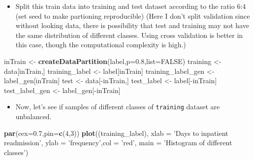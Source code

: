 \documentclass[]{article}
\newenvironment{Shaded}{\begin{snugshade}}{\end{snugshade}}
\newcommand{\KeywordTok}[1]{\textcolor[rgb]{0.13,0.29,0.53}{\textbf{{#1}}}}
\newcommand{\DataTypeTok}[1]{\textcolor[rgb]{0.13,0.29,0.53}{{#1}}}
\newcommand{\DecValTok}[1]{\textcolor[rgb]{0.00,0.00,0.81}{{#1}}}
\newcommand{\FloatTok}[1]{\textcolor[rgb]{0.00,0.00,0.81}{{#1}}}
\newcommand{\StringTok}[1]{\textcolor[rgb]{0.31,0.60,0.02}{{#1}}}
\newcommand{\OtherTok}[1]{\textcolor[rgb]{0.56,0.35,0.01}{{#1}}}
\newcommand{\NormalTok}[1]{{#1}}
\begin{document}
\begin{Shaded}
\end{Shaded}

\begin{itemize}
\itemsep1pt\parskip0pt
\item
  Split this train data into training and test dataset according to the
  ratio 6:4 (set seed to make partioning reproducible) (Here I don't
  split validation since without looking data, there is possibility that
  test and training may not have the same distribution of different
  classes. Using cross validation is better in this case, though the
  computational complexity is high.)
\end{itemize}

\begin{Shaded}
\begin{Highlighting}[]
\NormalTok{inTrain <-}\StringTok{ }\KeywordTok{createDataPartition}\NormalTok{(label,}\DataTypeTok{p=}\FloatTok{0.8}\NormalTok{,}\DataTypeTok{list=}\OtherTok{FALSE}\NormalTok{)}
\NormalTok{training <-}\StringTok{ }\NormalTok{data[inTrain,]}
\NormalTok{training_label <-}\StringTok{ }\NormalTok{label[inTrain]}
\NormalTok{training_label_gen <-}\StringTok{ }\NormalTok{label_gen[inTrain]}
\NormalTok{test <-}\StringTok{ }\NormalTok{data[-inTrain,]}
\NormalTok{test_label <-}\StringTok{ }\NormalTok{label[-inTrain]}
\NormalTok{test_label_gen <-}\StringTok{ }\NormalTok{label_gen[-inTrain]}
\end{Highlighting}
\end{Shaded}

\begin{itemize}
\itemsep1pt\parskip0pt
\item
  Now, let's see if samples of different classes of \texttt{training}
  dataset are unbalanced.
\end{itemize}

\begin{Shaded}
\begin{Highlighting}[]
\KeywordTok{par}\NormalTok{(}\DataTypeTok{cex=}\FloatTok{0.7}\NormalTok{,}\DataTypeTok{pin=}\KeywordTok{c}\NormalTok{(}\DecValTok{4}\NormalTok{,}\DecValTok{3}\NormalTok{))}
\KeywordTok{plot}\NormalTok{((training_label), }\DataTypeTok{xlab =} \StringTok{'Days to inpatient readmission'}\NormalTok{, }\DataTypeTok{ylab =} \StringTok{'frequency'}\NormalTok{,}\DataTypeTok{col =} \StringTok{'red'}\NormalTok{, }\DataTypeTok{main =} \StringTok{'Histogram of different classes'}\NormalTok{)}
\end{Highlighting}
\end{Shaded}
\end{document}
